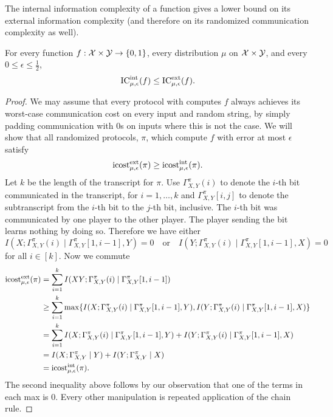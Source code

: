 The internal information complexity of a function gives a lower bound on its external information complexity (and therefore on its randomized communication complexity as well).

\begin{theorem}\label{th:6}
For every function $f : \mathcal{X} \times \mathcal{Y} \to \{0,1\}$, every distribution $\mu$ on $\mathcal{X} \times \mathcal{Y}$, and every $0 \le \epsilon \le \frac12$,
\[
\mathrm{IC}^{\mathrm{int}}_{\mu,\epsilon}(f) \le \mathrm{IC}^{\mathrm{ext}}_{\mu,\epsilon}(f).
\]
\end{theorem}

\begin{proof}
We may assume that every protocol with computes $f$ always achieves its worst-case communication cost on every input and random string, by simply padding communication with $0$s on inputs where this is not the case. We will show that all randomized protocols, $\pi$, which compute $f$ with error at most $\epsilon$ satisfy
$$\mathrm{icost}^{\mathrm{ext}}_{\mu,\epsilon}(\pi) \geq \mathrm{icost}^{\mathrm{int}}_{\mu,\epsilon}(\pi).$$
Let $k$ be the length of the transcript for $\pi$. Use $\Gamma^\pi_{X,Y}(i)$ to denote the $i$-th bit communicated in the transcript, for $i=1,\dots, k$ and $\Gamma^\pi_{X,Y}[i,j]$ to denote the subtranscript from the $i$-th bit to the $j$-th bit, inclusive. The $i$-th bit was communicated by one player to the other player. The player sending the bit learns nothing by doing so. Therefore we have either
$$I(X;\Gamma^\pi_{X,Y}(i) \mid \Gamma^{\pi}_{X,Y}[1,i-1], Y) = 0 \quad\text{or}\quad I(Y;\Gamma^\pi_{X,Y}(i) \mid \Gamma^{\pi}_{X,Y}[1,i-1], X) = 0 $$
for all $i\in[k]$.
Now we commute
\begin{align*}
\mathrm{icost}^{\mathrm{ext}}_{\mu,\epsilon}(\pi) &= \sum_{i=1}^k I(XY;\Gamma^\pi_{X,Y}(i) \mid \Gamma^\pi_{X,Y}[1,i-1]) \\
&\geq \sum_{i=1}^k\max\{I(X;\Gamma^\pi_{X,Y}(i) \mid \Gamma^{\pi}_{X,Y}[1,i-1], Y), I(Y;\Gamma^\pi_{X,Y}(i) \mid \Gamma^{\pi}_{X,Y}[1,i-1], X)\}\\
&=\sum_{i=1}^k I(X;\Gamma^\pi_{X,Y}(i) \mid \Gamma^{\pi}_{X,Y}[1,i-1], Y)+ I(Y;\Gamma^\pi_{X,Y}(i) \mid \Gamma^{\pi}_{X,Y}[1,i-1], X) \\
&= I(X;\Gamma^\pi_{X,Y} \mid Y) + I(Y; \Gamma^\pi_{X,Y} \mid X) \\
&= \mathrm{icost}^{\mathrm{int}}_{\mu,\epsilon}(\pi).
\end{align*}
The second inequality above follows by our observation that one of the terms in each max is $0$. Every other manipulation is repeated application of the chain rule.
\end{proof}


